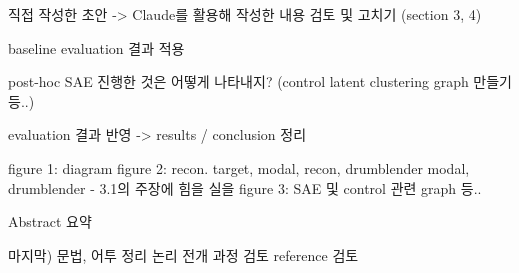 직접 작성한 초안 -> Claude를 활용해 작성한 내용 검토 및 고치기 (section 3, 4)

baseline evaluation 결과 적용

post-hoc SAE 진행한 것은 어떻게 나타내지? (control latent clustering graph 만들기 등..)

evaluation 결과 반영 -> results / conclusion 정리

figure 1: diagram
figure 2: recon. target, modal, recon, drumblender modal, drumblender - 3.1의 주장에 힘을 실을
figure 3: SAE 및 control 관련 graph 등..

Abstract 요약


마지막)
문법, 어투 정리
논리 전개 과정 검토
reference 검토